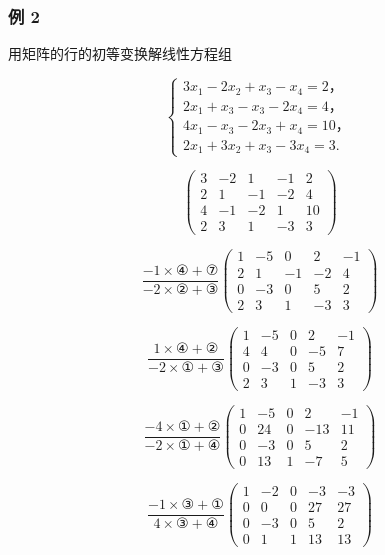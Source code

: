 \subsubsection{例 2}

用矩阵的行的初等变换解线性方程组

\[
\left\{ \begin{array}{l} 3 x _ {1} - 2 x _ {2} + x _ {3} - x _ {4} = 2\text{，} \\ 2 x _ {1} + x _ {3} - x _ {3} - 2 x _ {4} = 4\text{，} \\ 4 x _ {1} - x _ {3} - 2 x _ {3} + x _ {4} = 10\text{，} \\ 2 x _ {1} + 3 x _ {2} + x _ {3} - 3 x _ {4} = 3. \end{array} \right.
\]


\[
\left( \begin{array}{ccccc} 3 & - 2 & 1 & - 1 & 2 \\ 2 & 1 & - 1 & - 2 & 4 \\ 4 & - 1 & - 2 & 1 & 10 \\ 2 & 3 & 1 & - 3 & 3 \end{array} \right)
\]

\[
\frac {- 1 \times ④ + ⑦}{- 2 \times ② + ③} \left( \begin{array}{ccccc} 1 & - 5 & 0 & 2 & - 1 \\ 2 & 1 & - 1 & - 2 & 4 \\ 0 & - 3 & 0 & 5 & 2 \\ 2 & 3 & 1 & - 3 & 3 \end{array} \right)
\]

\[
\frac {1 \times ④ + ②}{- 2 \times ① + ③} \left( \begin{array}{ccccc} 1 & - 5 & 0 & 2 & - 1 \\ 4 & 4 & 0 & - 5 & 7 \\ 0 & - 3 & 0 & 5 & 2 \\ 2 & 3 & 1 & - 3 & 3 \end{array} \right)
\]

\[
\frac {- 4 \times ① + ②}{- 2 \times ① + ④} \left( \begin{array}{ccccc} 1 & - 5 & 0 & 2 & - 1 \\ 0 & 24 & 0 & - 13 & 11 \\ 0 & - 3 & 0 & 5 & 2 \\ 0 & 13 & 1 & - 7 & 5 \end{array} \right)
\]

\[
\frac {-1\times③+①}{4 \times ③ + ④} \left( \begin{array}{ccccc} 1 & - 2 & 0 & - 3 & - 3 \\ 0 & 0 & 0 & 27 & 27 \\ 0 & - 3 & 0 & 5 & 2 \\ 0 & 1 & 1 & 13 & 13 \end{array} \right)
\]

